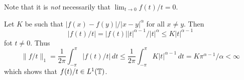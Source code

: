 \begin{enumerate}
{\small
Note that it is \emph{not} necessarily that \(\lim_{t\to 0}f(t)/t = 0\).
}

Let $K$ be such that \(|f(x)-f(y)|/|x-y|^\alpha\) for all \(x\neq y\).
Then 
\begin{equation*}
|f(t)/t| 
= |f(t)| |t|^{\alpha-1}/|t|^\alpha
\leq K |t|^{\alpha-1}
\end{equation*}
fot \(t\neq 0\). Thus
\begin{equation*}
\|f/t\|_1
= \frac{1}{2\pi} \int_{-\pi}^\pi |f(t)/t|\,dt 
\leq \frac{1}{2\pi} \int_{-\pi}^\pi K|t|^{\alpha-1}\,dt 
= K\pi^{\alpha-1}/\alpha < \infty
\end{equation*}
which shows that \(f(t)/t \in L^1(\mathbb{T})\).
\fi


\end{enumerate}
